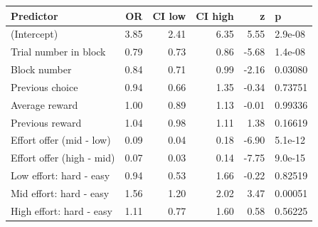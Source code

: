 \begin{table}[ht]
\centering
\begin{tabular}{lrrrrl}
  \hline
Predictor & OR & CI low & CI high & z & p \\ 
  \hline
(Intercept) & 3.85 & 2.41 & 6.35 & 5.55 & 2.9e-08 \\ 
  Trial number in block & 0.79 & 0.73 & 0.86 & -5.68 & 1.4e-08 \\ 
  Block number & 0.84 & 0.71 & 0.99 & -2.16 & 0.03080 \\ 
  Previous choice & 0.94 & 0.66 & 1.35 & -0.34 & 0.73751 \\ 
  Average reward & 1.00 & 0.89 & 1.13 & -0.01 & 0.99336 \\ 
  Previous reward & 1.04 & 0.98 & 1.11 & 1.38 & 0.16619 \\ 
  Effort offer (mid - low) & 0.09 & 0.04 & 0.18 & -6.90 & 5.1e-12 \\ 
  Effort offer (high - mid) & 0.07 & 0.03 & 0.14 & -7.75 & 9.0e-15 \\ 
  Low effort: hard - easy & 0.94 & 0.53 & 1.66 & -0.22 & 0.82519 \\ 
  Mid effort: hard - easy & 1.56 & 1.20 & 2.02 & 3.47 & 0.00051 \\ 
  High effort: hard - easy & 1.11 & 0.77 & 1.60 & 0.58 & 0.56225 \\ 
   \hline
\end{tabular}
\end{table}
